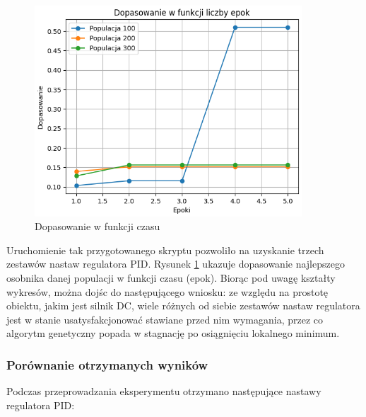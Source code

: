 \documentclass[12pt,twoside]{article}
\begin{document}
\begin{figure}[ht]%
 \centering%
 \includegraphics[width=10cm]{figures/PID/gen.png}%
 \caption{Dopasowanie w funkcji czasu}%
 \label{Fig:gen}%
\end{figure}

Uruchomienie tak przygotowanego skryptu pozwoliło na uzyskanie trzech zestawów nastaw regulatora PID. Rysunek \ref{Fig:gen} ukazuje dopasowanie najlepszego osobnika danej populacji w funkcji czasu (epok). Biorąc pod uwagę kształty wykresów, można dojśc do następującego wniosku: ze względu na prostotę obiektu, jakim jest silnik DC, wiele różnych od siebie zestawów nastaw regulatora jest w stanie usatysfakcjonować stawiane przed nim wymagania, przez co algorytm genetyczny popada w stagnację po osiągnięciu lokalnego minimum.



\subsubsection{Porównanie otrzymanych wyników}
Podczas przeprowadzania eksperymentu otrzymano następujące nastawy regulatora PID:
\end{document}
